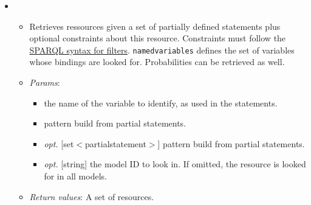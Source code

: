 \begin{itemize}
\item  {}
\begin{itemize}
\item  Retrieves ressources given a set of partially defined statements plus optional constraints about this resource. Constraints must follow the \href{http://www.w3.org/TR/rdf-sparql-query/\#tests}{ SPARQL syntax for filters}. \texttt{named{\textunderscore}variables} defines the set of variables whose bindings are looked for. Probabilities can be retrieved as well.
% 
% 
% 
% 
\item  \emph{Params}:
\begin{itemize}
\item  [string] the name of the variable to identify, as used in the statements.
\item  [set$<$partial{\textunderscore}statement$>$] pattern build from partial statements.
\item  \emph{opt.} [set$<$partial{\textunderscore}statement$>$] pattern build from partial statements.
\item  \emph{opt.} [string] the model ID to look in. If omitted, the resource is looked for in all models. 
\end{itemize}

\item  \emph{Return values}: A set of resources.
\end{itemize}


\end{itemize}
